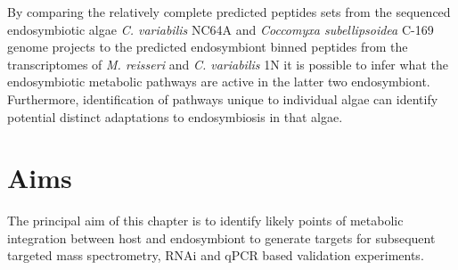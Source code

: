 By comparing the relatively complete predicted peptides sets from 
the sequenced endosymbiotic algae \textit{C. variabilis} NC64A and \textit{Coccomyxa
subellipsoidea} C-169 genome projects to the predicted endosymbiont binned peptides
from the transcriptomes of \textit{M. reisseri} and \textit{C. variabilis} 1N
it is possible to infer what the endosymbiotic metabolic pathways 
are active in the latter two endosymbiont.  Furthermore, identification
of pathways unique to individual algae can identify potential distinct
adaptations to endosymbiosis in that algae.

%
%
%
%
%
%
%
%
%


\section{Aims}

The principal aim of this chapter is to identify
likely points of metabolic integration between host and 
endosymbiont to generate targets for subsequent 
targeted mass spectrometry, RNAi and qPCR based validation
experiments. 

